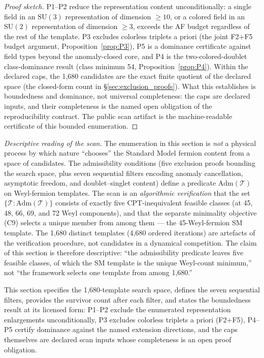 \documentclass[11pt]{article}
\theoremstyle{definition}
\newcommand{\SU}{\mathrm{SU}}
\begin{document}
\begin{proof}[Proof sketch]
P1--P2 reduce the representation content unconditionally: a single
field in an $\SU(3)$ representation of dimension $\ge 10$, or a
colored field in an $\SU(2)$ representation of dimension $\ge 3$,
exceeds the AF budget regardless of the rest of the template.  P3 excludes
colorless triplets a priori (the joint F2$+$F5 budget argument,
Proposition~\ref{prop:P3}), P5 is a dominance certificate against
field types beyond the anomaly-closed core, and P4 is the
two-colored-doublet class-dominance result (class minimum 54,
Proposition~\ref{prop:P4}).  Within the declared
caps, the 1{,}680 candidates are the exact finite quotient of the
declared space (the closed-form count in
\S\ref{sec:exclusion_proofs}).  What this establishes is boundedness
and dominance, not universal completeness: the caps are declared
inputs, and their completeness is the named open obligation of the
reproducibility contract.  The public scan artifact is the
machine-readable certificate of this bounded enumeration.
\end{proof}

\smallskip\noindent\textit{Descriptive reading of the scan.}\quad
The enumeration in this section is \emph{not} a physical process by
which nature ``chooses'' the Standard Model fermion content from a
space of candidates.  The admissibility conditions (five exclusion
proofs bounding the search space, plus seven sequential filters
encoding anomaly cancellation, asymptotic freedom, and
doublet--singlet content)
define a predicate
$\mathrm{Adm}(\mathcal{T})$ on Weyl-fermion templates.  The scan
is an \emph{algorithmic verification} that the set
$\{\mathcal{T} : \mathrm{Adm}(\mathcal{T})\}$ consists of exactly
five CPT-inequivalent feasible classes (at 45, 48, 66, 69, and 72
Weyl components), and that the separate minimality objective (C9)
selects a unique member from among them --- the 45-Weyl-fermion SM
template.  The 1{,}680 distinct templates (4{,}680 ordered
iterations) are artefacts of the verification procedure, not
candidates in a dynamical competition.  The claim of this section is
therefore descriptive: ``the admissibility predicate leaves five
feasible classes, of which the SM template is the unique
Weyl-count minimum,'' not ``the framework selects one template
from among 1{,}680.''

This section specifies the 1{,}680-template search space, defines the
seven sequential filters, provides the survivor count after each
filter, and states the boundedness result at its licensed form:
P1--P2 exclude the enumerated representation enlargements
unconditionally, P3 excludes colorless triplets a priori (F2$+$F5),
P4--P5 certify dominance against the named extension directions, and
the caps themselves are declared scan inputs whose completeness is an
open proof obligation.
\end{document}
